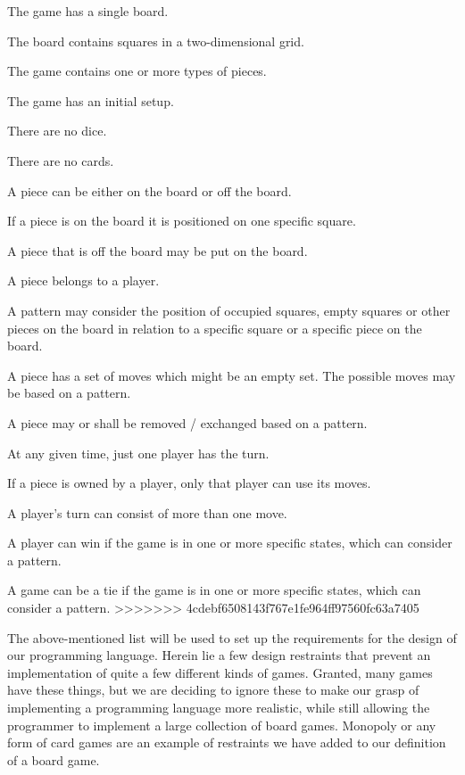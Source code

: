 \begin{dlist}
\begin{dlist}
  \item The game has a single board.
  \item The board contains squares in a two-dimensional grid.
  \item The game contains one or more types of pieces.
  \item The game has an initial setup.
  \item There are no dice.
  \item There are no cards.
  \item A piece can be either on the board or off the board. 
  \begin{dlist}
  \item If a piece is on the board it is positioned on one specific square.
  \item A piece that is off the board may be put on the board.
  \end{dlist}
  \item A piece belongs to a player.
  \item A pattern may consider the position of occupied squares, empty squares or other pieces on the board in relation to a specific square or a specific piece on the board.
  \item A piece has a set of moves which might be an empty set. The possible moves may be based on a pattern.
  \item A piece may or shall be removed / exchanged based on a pattern.
  \item At any given time, just one player has the turn.
  \item If a piece is owned by a player, only that player can use its moves.
  \item A player's turn can consist of more than one move.
  \item A player can win if the game is in one or more specific states, which can consider a pattern.
  \item A game can be a tie if the game is in one or more specific states, which can consider a pattern.
>>>>>>> 4cdebf6508143f767e1fe964ff97560fc63a7405
\end{dlist}

The above-mentioned list will be used to set up the requirements for the design of our programming language. 
Herein lie a few design restraints that prevent an implementation of quite a few different kinds of games. 
Granted, many games have these things, but we are deciding to ignore these to make our grasp of implementing a programming language more realistic, while still allowing the programmer to implement a large collection of board games. 
Monopoly or any form of card games are an example of restraints we have added to our definition of a board game.


\end{dlist}
